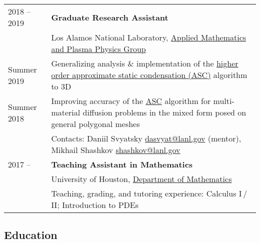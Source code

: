\documentclass[a4paper,12pt]{article}
\begin{document}
\begin{longtable}{ l >{\raggedright\arraybackslash}p{15cm} }
		2018 -- 2019
			& \textbf{Graduate Research Assistant}\vspace{1mm}\\
			& Los Alamos National Laboratory, \href{http://www.lanl.gov/org/padste/adtsc/theoretical/applied-mathematics-plasma-physics}{Applied Mathematics and Plasma Physics Group}\vspace{1mm}\\
		Summer 2019
			& Generalizing analysis \& implementation of the \href{https://www.researchgate.net/publication/330912268_A_higher_order_approximate_static_condensation_method_for_multi-material_diffusion_problems}{higher order approximate static condensation (ASC)} algorithm to 3D\vspace{1mm}\\
		Summer 2018
			& Improving accuracy of the \href{https://www.researchgate.net/publication/318300724_Approximate_static_condensation_algorithm_for_solving_multi-material_diffusion_problems_on_meshes_non-aligned_with_material_interfaces}{ASC} algorithm for multi-material diffusion problems in the mixed form posed on general polygonal meshes\vspace{1mm}\\
			& Contacts: Daniil Svyatsky \href{mailto:dasvyat@lanl.gov}{dasvyat@lanl.gov} (mentor), Mikhail Shashkov \href{mailto:shashkov@lanl.gov}{shashkov@lanl.gov}\vspace{3mm}\\
		2017 -- 
			& \textbf{Teaching Assistant in Mathematics}\vspace{1mm}\\
			& University of Houston, \href{http://www.uh.edu/nsm/math/}{Department of Mathematics}\vspace{1mm}\\
			& Teaching, grading, and tutoring experience: Calculus I\,/\,II; Introduction to PDEs
	\end{longtable}

	\subsection*{Education}
\end{document}
